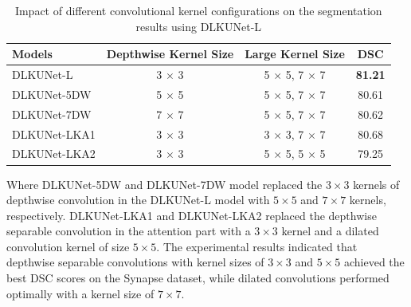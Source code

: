 \documentclass[sn-mathphys-num]{sn-jnl}
\theoremstyle{thmstyleone}%
\theoremstyle{thmstyletwo}%
\theoremstyle{thmstylethree}%
\begin{document}
\begin{table}[h]
    \centering
    \caption{Impact of different convolutional kernel configurations on the segmentation results using DLKUNet-L}
    \label{tab5}
    \begin{tabular*}{\textwidth}{@{\extracolsep{\fill}}lccc}
        \toprule
        \textbf{Models} & \textbf{Depthwise Kernel Size} & \textbf{Large Kernel Size} & \textbf{DSC} \\
        \midrule
        DLKUNet-L     & 3 $\times$ 3     & 5 $\times$ 5, 7 $\times$ 7  & \textbf{81.21} \\
        DLKUNet-5DW   & 5 $\times$ 5     & 5 $\times$ 5, 7 $\times$ 7  & 80.61 \\
        DLKUNet-7DW   & 7 $\times$ 7     & 5 $\times$ 5, 7 $\times$ 7  & 80.62 \\
        DLKUNet-LKA1  & 3 $\times$ 3     & 3 $\times$ 3, 7 $\times$ 7  & 80.68 \\
        DLKUNet-LKA2  & 3 $\times$ 3     & 5 $\times$ 5, 5 $\times$ 5  & 79.25 \\
        \bottomrule
    \end{tabular*}
\end{table}

Where DLKUNet-5DW and DLKUNet-7DW model replaced the \(3\times 3\) kernels of depthwise convolution in the DLKUNet-L model with \(5\times 5\) and \(7\times 7\) kernels, respectively.
DLKUNet-LKA1 and DLKUNet-LKA2 replaced the depthwise separable convolution in the attention part with a \(3\times 3\) kernel and a dilated convolution kernel of size \(5\times 5\).
The experimental results indicated that depthwise separable convolutions with kernel sizes of \(3\times 3\) and \(5\times 5\) achieved the best DSC scores on the Synapse dataset, while dilated convolutions performed optimally with a kernel size of \(7\times 7\).
\end{document}
